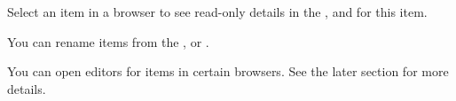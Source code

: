 Select an item in a browser to see read-only details in the \gdpropview{}, \gddatasetsview{} and \gdcompnamesview{} for this item. 

You can rename items from the \gdtestcasebrowser{}, \gdtestsuitebrowser{} or 
\gdcompnamebrowser{}. 

You can open editors for items in certain browsers. See the later section 
 for more details.
